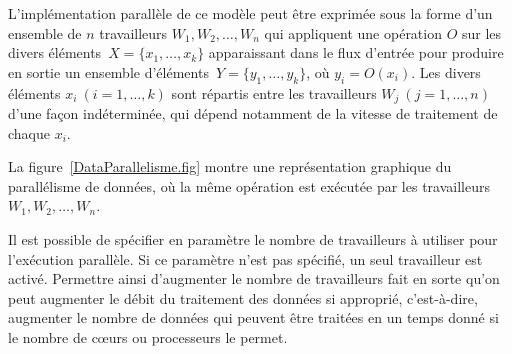 



L'impl\'ementation parall\`ele de ce mod\`ele peut \^etre
exprim\'ee sous la forme d'un ensemble de $n$ travailleurs $W_1, W_2,\ldots, W_n$ qui
appliquent une op\'eration $O$ sur les divers \'el\'ements~$X = \{x_1, \ldots, x_k\}$ apparaissant dans
le flux d'entr\'ee pour produire en sortie un ensemble d'\'el\'ements~$Y = \{y_1, \ldots, y_k\}$, o\`u $y_i = O(x_i)$.
%
Les divers \'el\'ements $x_i~(i=1, \ldots, k)$ sont r\'epartis entre
les travailleurs $W_j~(j=1, \ldots, n)$ d'une fa\c{c}on
ind\'etermin\'ee, qui d\'epend notamment de la vitesse de traitement
de chaque $x_i$.
%

La figure~\ref{DataParallelisme.fig} montre une repr\'esentation graphique du parall\'elisme de donn\'ees, o\`u la m\^eme op\'eration est ex\'ecut\'ee par les travailleurs $W_1, W_2,\ldots, W_n$. 

Il est possible de sp\'ecifier en param\`etre le nombre de travailleurs \`a utiliser pour l'ex\'ecution parall\`ele. Si ce param\`etre n'est pas sp\'ecifi\'e, un seul travailleur est activ\'e. Permettre ainsi d'augmenter le nombre de travailleurs fait en sorte qu'on peut augmenter le d\'ebit du traitement des donn\'ees si appropri\'e, c'est-\`a-dire, augmenter le nombre de donn\'ees qui peuvent \^etre trait\'ees en un temps donn\'e si le nombre de c\oe{}urs ou processeurs le permet.




